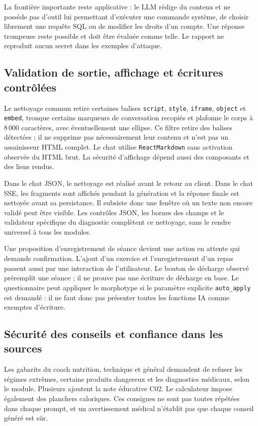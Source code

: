 La frontière importante reste applicative : le LLM rédige du contenu et ne possède pas d'outil lui permettant d'exécuter une commande système, de choisir librement une requête SQL ou de modifier les droits d'un compte. Une réponse trompeuse reste possible et doit être évaluée comme telle. Le rapport ne reproduit aucun secret dans les exemples d'attaque.

\subsection{Validation de sortie, affichage et écritures contrôlées}
Le nettoyage commun retire certaines balises \texttt{script}, \texttt{style}, \texttt{iframe}, \texttt{object} et \texttt{embed}, tronque certains marqueurs de conversation recopiés et plafonne le corps à 8\,000 caractères, avec éventuellement une ellipse. Ce filtre retire des balises détectées ; il ne supprime pas nécessairement leur contenu et n'est pas un assainisseur HTML complet. Le chat utilise \texttt{ReactMarkdown} sans activation observée du HTML brut. La sécurité d'affichage dépend aussi des composants et des liens rendus.

Dans le chat JSON, le nettoyage est réalisé avant le retour au client. Dans le chat SSE, les fragments sont affichés pendant la génération et la réponse finale est nettoyée avant sa persistance. Il subsiste donc une fenêtre où un texte non encore validé peut être visible. Les contrôles JSON, les bornes des champs et le validateur spécifique du diagnostic complètent ce nettoyage, sans le rendre universel à tous les modules.

Une proposition d'enregistrement de séance devient une action en attente qui demande confirmation. L'ajout d'un exercice et l'enregistrement d'un repas passent aussi par une interaction de l'utilisateur. Le bouton de décharge observé préremplit une séance ; il ne prouve pas une écriture de décharge en base. Le questionnaire peut appliquer le morphotype si le paramètre explicite \texttt{auto\_apply} est demandé : il ne faut donc pas présenter toutes les fonctions IA comme exemptes d'écriture.

\clearpage
\subsection{Sécurité des conseils et confiance dans les sources}
Les gabarits du coach nutrition, technique et général demandent de refuser les régimes extrêmes, certains produits dangereux et les diagnostics médicaux, selon le module. Plusieurs ajoutent la note éducative C02. Le calculateur impose également des planchers caloriques. Ces consignes ne sont pas toutes répétées dans chaque prompt, et un avertissement médical n'établit pas que chaque conseil généré est sûr.


